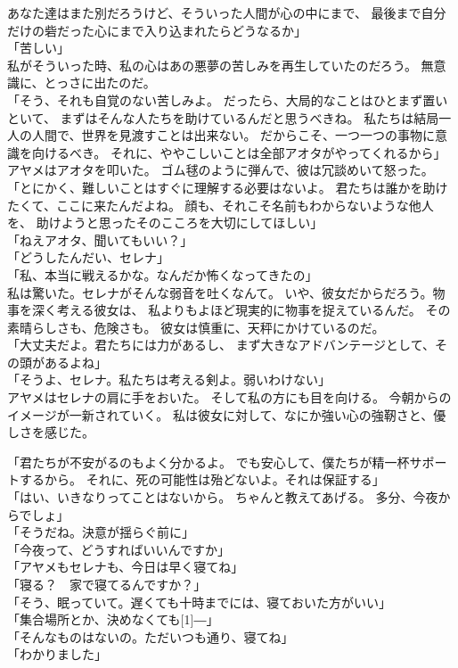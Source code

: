 \documentclass[../IHMain]{subfiles}
\begin{document}
あなた達はまた別だろうけど、そういった人間が心の中にまで、
最後まで自分だけの砦だった心にまで入り込まれたらどうなるか」\\
「苦しい」\\
私がそういった時、私の心はあの悪夢の苦しみを再生していたのだろう。
無意識に、とっさに出たのだ。\\
「そう、それも自覚のない苦しみよ。
だったら、大局的なことはひとまず置いといて、
まずはそんな人たちを助けているんだと思うべきね。
私たちは結局一人の人間で、世界を見渡すことは出来ない。
だからこそ、一つ一つの事物に意識を向けるべき。
それに、ややこしいことは全部アオタがやってくれるから」\\
アヤメはアオタを叩いた。
ゴム毬のように弾んで、彼は冗談めいて怒った。\\
「とにかく、難しいことはすぐに理解する必要はないよ。
君たちは誰かを助けたくて、ここに来たんだよね。
顔も、それこそ名前もわからないような他人を、
助けようと思ったそのこころを大切にしてほしい」\\
「ねえアオタ、聞いてもいい？」\\
「どうしたんだい、セレナ」\\
「私、本当に戦えるかな。なんだか怖くなってきたの」\\
私は驚いた。セレナがそんな弱音を吐くなんて。
いや、彼女だからだろう。物事を深く考える彼女は、
私よりもよほど現実的に物事を捉えているんだ。
その素晴らしさも、危険さも。
彼女は慎重に、天秤にかけているのだ。\\
「大丈夫だよ。君たちには力があるし、
まず大きなアドバンテージとして、その頭があるよね」\\
「そうよ、セレナ。私たちは考える剣よ。弱いわけない」\\
アヤメはセレナの肩に手をおいた。
そして私の方にも目を向ける。
今朝からのイメージが一新されていく。
私は彼女に対して、なにか強い心の強靭さと、優しさを感じた。

「君たちが不安がるのもよく分かるよ。
でも安心して、僕たちが精一杯サポートするから。
それに、死の可能性は殆どないよ。それは保証する」\\
「はい、いきなりってことはないから。
ちゃんと教えてあげる。
多分、今夜からでしょ」\\
「そうだね。決意が揺らぐ前に」\\
「今夜って、どうすればいいんですか」\\
「アヤメもセレナも、今日は早く寝てね」\\
「寝る？　家で寝てるんですか？」\\
「そう、眠っていて。遅くても十時までには、寝ておいた方がいい」\\
「集合場所とか、決めなくても\scalebox{3}[1]{―}」\\
「そんなものはないの。ただいつも通り、寝てね」\\
「わかりました」
\end{document}

